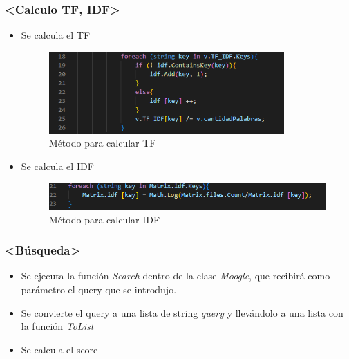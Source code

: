 \documentclass{beamer}
\begin{document}
        \begin{frame}
            \frametitle{<Calculo TF, IDF>}

            \begin{itemize}
                \item Se calcula el TF
        
        \begin{figure}[h]

            \centering
            \label{imag: TF}
            \includegraphics[width=9cm]{TF.png}
            \caption[]{ \footnotesize Método para calcular TF}
        
        \end{figure}

        \item Se calcula el IDF
        
        \begin{figure}[h]

            \centering
            \label{imag: IDF}
            \includegraphics[width=13cm]{IDF.png}
            \caption[]{ \footnotesize Método para calcular IDF}
        
        \end{figure}

            \end{itemize}
        
        \end{frame}

        \begin{frame}
            \frametitle{<Búsqueda>}
        
            \begin{itemize}
                \item Se ejecuta la función \textit{Search} dentro de la clase \textit{Moogle},
                que recibirá como parámetro el query que se introdujo.
                \item Se convierte el query a una lista de string \textit{query} y llevándolo a una lista con la
                 función \textit{ToList}
                \item Se calcula el score
            \end{itemize}
        
        \end{frame}
\end{document}
